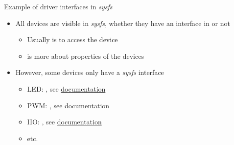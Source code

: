 \begin{frame}{Example of driver interfaces in {\em sysfs}}
  \begin{itemize}
  \item All devices are visible in {\em sysfs}, whether they have an
    interface in  or not
    \begin{itemize}
    \item Usually  is to access the device
    \item {} is more about properties of the devices
    \end{itemize}
  \item However, some devices only have a {\em sysfs} interface
    \begin{itemize}
    \item LED: , see \href{https://docs.kernel.org/leds/leds-class.html}{documentation}
    \item PWM: , see \href{https://docs.kernel.org/driver-api/pwm.html\#using-pwms-with-the-sysfs-interface}{documentation}
    \item IIO: , see \href{https://docs.kernel.org/driver-api/iio/index.html}{documentation}
    \item etc.
    \end{itemize}
  \end{itemize}
\end{frame}

